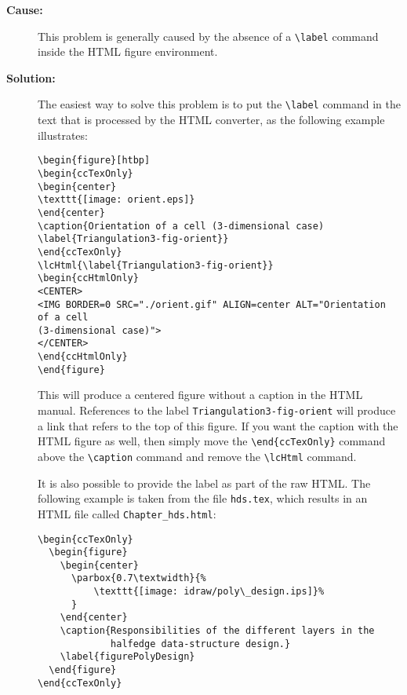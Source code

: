 
\begin{description}
\item[{\bf Cause:}] This problem is generally caused by the absence of a
     \verb|\label| command inside the HTML figure environment.

\item[{\bf Solution:}]  
The easiest way to solve this problem is to put the 
\verb|\label| command in the text that is processed by the HTML converter,
as the following example illustrates:

\begin{verbatim}
\begin{figure}[htbp]
\begin{ccTexOnly}
\begin{center}
\texttt{[image: orient.eps]}
\end{center}
\caption{Orientation of a cell (3-dimensional case)
\label{Triangulation3-fig-orient}}
\end{ccTexOnly}
\lcHtml{\label{Triangulation3-fig-orient}}
\begin{ccHtmlOnly}
<CENTER>
<IMG BORDER=0 SRC="./orient.gif" ALIGN=center ALT="Orientation of a cell
(3-dimensional case)">
</CENTER>
\end{ccHtmlOnly}
\end{figure}
\end{verbatim}

This will produce a centered figure without a caption in the HTML manual.
References to the label {\tt Triangulation3-fig-orient} will produce a
link that refers to the top of this figure.  If you want the caption with
the HTML figure as well, then simply move the \verb|\end{ccTexOnly}|
command above the \verb|\caption| command and remove the \verb|\lcHtml|
command.

It is also possible to provide the label as part of the raw
HTML.  The following example is taken from the file {\tt hds.tex}, which
results in an HTML file called {\tt Chapter\_hds.html}:

\begin{verbatim}
\begin{ccTexOnly}
  \begin{figure}
    \begin{center}
      \parbox{0.7\textwidth}{%
          \texttt{[image: idraw/poly\_design.ips]}%
      }
    \end{center}
    \caption{Responsibilities of the different layers in the
             halfedge data-structure design.}
    \label{figurePolyDesign}
  \end{figure}
\end{ccTexOnly}


\end{verbatim}
\end{description}
